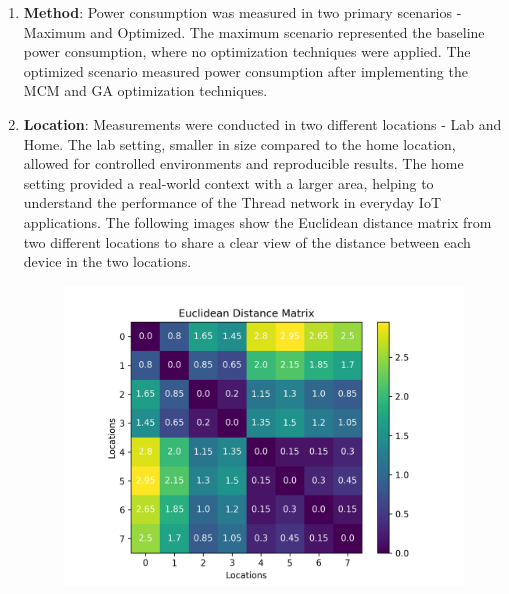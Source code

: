 \begin{enumerate}
    \item \textbf{Method}: Power consumption was measured in two primary scenarios - Maximum and Optimized. The maximum scenario represented the baseline power consumption, where no optimization techniques were applied. The optimized scenario measured power consumption after implementing the MCM and GA optimization techniques.
    \item \textbf{Location}: Measurements were conducted in two different locations - Lab and Home. The lab setting, smaller in size compared to the home location, allowed for controlled environments and reproducible results. The home setting provided a real-world context with a larger area, helping to understand the performance of the Thread network in everyday IoT applications. The following images show the Euclidean distance matrix from two different locations to share a clear view of the distance between each device in the two locations.
    \begin{figure}[H]
        \centering
        \begin{minipage}{0.5\textwidth}
            \centering
            \includegraphics[width=1\textwidth]{images/research_design/distance_matrix_lab.png}
            \label{fig:distance_matrix_lab}
        \end{minipage}%
        \begin{minipage}{0.5\textwidth}
            \centering

\end{minipage}
\end{figure}
\end{enumerate}
